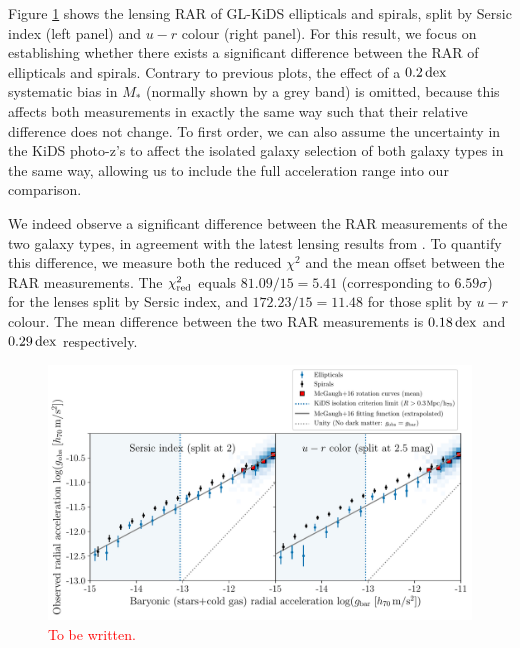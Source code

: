 \documentclass[usenatbib]{mnras}
\newcommand{\un}[1]{_{\rm #1}}
\newcommand{\dex}{\, {\rm dex}}
\begin{document}
Figure \ref{fig:RAR_kids_galtypebins} shows the lensing RAR of GL-KiDS ellipticals and spirals, split by Sersic index (left panel) and $u-r$ colour (right panel). For this result, we focus on establishing whether there exists a significant difference between the RAR of ellipticals and spirals. Contrary to previous plots, the effect of a $0.2 \dex$ systematic bias in $M_*$ (normally shown by a grey band) is omitted, because this affects both measurements in exactly the same way such that their relative difference does not change. To first order, we can also assume the uncertainty in the KiDS photo-z's to affect the isolated galaxy selection of both galaxy types in the same way, allowing us to include the full acceleration range into our comparison.

We indeed observe a significant difference between the RAR measurements of the two galaxy types, in agreement with the latest lensing results from \cite{taylor2020}. To quantify this difference, we measure both the reduced $\chi^2$ and the mean offset between the RAR measurements. The $\chi\un{red}^2$ equals $81.09 / 15 = 5.41$ (corresponding to $6.59 \sigma$) for the lenses split by Sersic index, and $172.23 / 15 = 11.48$ for those split by $u-r$ colour. The mean difference between the two RAR measurements is $0.18 \dex$ and $0.29 \dex$ respectively.

\begin{figure}
	\includegraphics[width=\textwidth]{Figures/RAR_KiDS_galtypes-sersic_isolated_samemass.pdf}
	\caption{\textcolor{red}{To be written.}}
	\label{fig:RAR_kids_galtypebins}
\end{figure}
\end{document}
